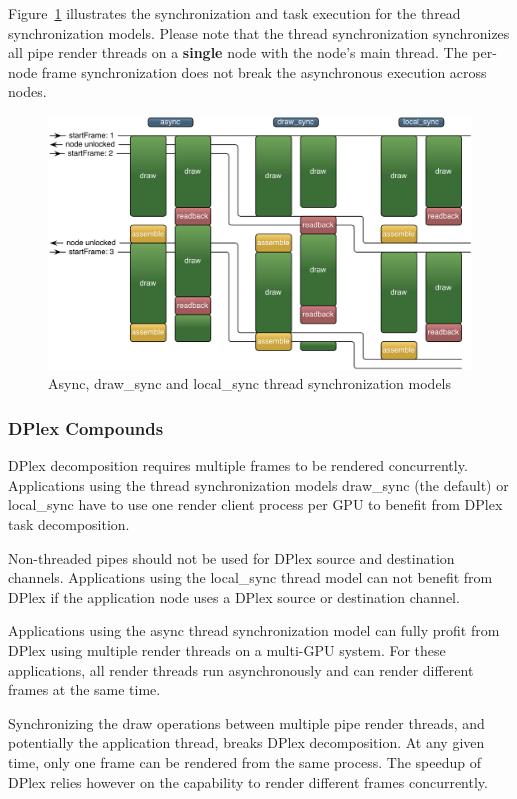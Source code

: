 \documentclass[10pt,a4]{scrartcl}
\newcommand{\fig}[1]{Figure~\ref{#1}}
\begin{document}
\fig{fThreadModels} illustrates the synchronization and task execution
for the thread synchronization models. Please note that the thread
synchronization synchronizes all pipe render threads on a
\textbf{single} node with the node's main thread. The per-node frame
synchronization does not break the asynchronous execution across
nodes.

\begin{figure}[ht!]\center
  \includegraphics[width=.9\textwidth]{images/threadModels.pdf}
  {\caption{\label{fThreadModels}Async, draw\_sync and local\_sync
    thread synchronization models}}
\end{figure}


\subsubsection{\label{sAdvDPlex}DPlex Compounds}

DPlex decomposition requires multiple frames to be rendered
concurrently. Applications using the thread synchronization models
\textsf{draw\_sync} (the default) or \textsf{local\_sync} have to use
one render client process per GPU to benefit from DPlex task
decomposition.

Non-threaded pipes should not be used for DPlex source and destination
channels. Applications using the \textsf{local\_sync} thread model can
not benefit from DPlex if the application node uses a DPlex source or
destination channel.

Applications using the \textsf{async} thread synchronization model can
fully profit from DPlex using multiple render threads on a multi-GPU
system. For these applications, all render threads run asynchronously
and can render different frames at the same time.

Synchronizing the draw operations between multiple pipe render threads,
and potentially the application thread, breaks DPlex decomposition. At
any given time, only one frame can be rendered from the same
process. The speedup of DPlex relies however on the capability to
render different frames concurrently.
\end{document}
